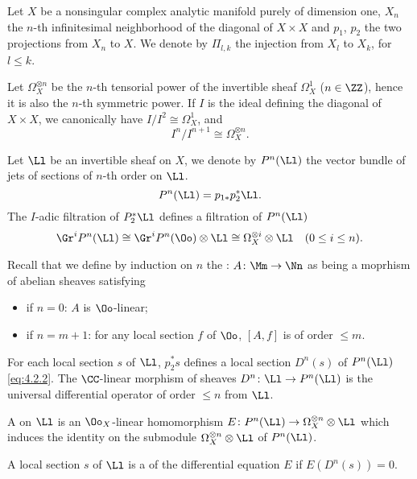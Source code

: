 \begin{para}\label{hypothesis:4.2}
  Let $X$ be a nonsingular complex analytic manifold purely of dimension one,
  $X_n$ the $n$-th infinitesimal neighborhood of the diagonal of $X\times X$
  and $p_1$, $p_2$ the two projections from $X_n$ to $X$.
  We denote by $\Pi_{l,k}$ the injection from $X_l$ to $X_k$, for $l\le k$.

  Let $\Omega_X^{\otimes n}$ be the $n$-th tensorial power of the invertible
  sheaf $\Omega_X^1$ ($n\in\ZZ$), hence it is also the $n$-th symmetric power.
  If $I$ is the ideal defining the diagonal of $X\times X$, we canonically have
  $I/I^2\cong\Omega_X^1$, and
  \begin{equation}
    I^n/I^{n+1} \cong \Omega_X^{\otimes n}.
  \end{equation}

  Let $\Ll$ be an invertible sheaf on $X$, we denote by $P^n(\Ll)$ the vector
  bundle of jets of sections of $n$-th order on $\Ll$.
  \begin{equation}\label{eq:4.2.2}
    P^n(\Ll) = p_{1\ast}p_2^\ast\Ll.
  \end{equation}
  The $I$-adic filtration of $P_2^{\ast}\Ll$ defines a filtration of $P^n(\Ll)$
  \begin{equation}\label{eq:4.2.3}
    \Gr^iP^n(\Ll) \cong \Gr^iP^n(\Oo)\otimes\Ll
    \cong \Omega_X^{\otimes i}\otimes\Ll\quad(0\le i\le n).
  \end{equation}

  Recall that we define by induction on $n$ the : $A\colon\Mm\to\Nn$
  as being a moprhism of abelian sheaves satisfying
  \begin{itemize}
    \item if $n=0$: $A$ is $\Oo$-linear;
    \item if $n=m+1$: for any local section $f$ of $\Oo$, $[A,f]$ is of order
    $\le m$.
  \end{itemize}

  For each local section $s$ of $\Ll$, $p_2^{\ast}s$ defines a local section
  $D^n(s)$ of $P^n(\Ll)$ \cref{eq:4.2.2}.
  The $\CC$-linear morphism of sheaves $D^n\colon\Ll\to P^n(\Ll)$ is the
  universal differential operator of order $\le n$ from $\Ll$.
\end{para}

\begin{definition}
  \begin{paras}
    \item A 
    on $\Ll$ is an $\Oo_X$-linear homomorphism
    $E\colon P^n(\Ll)\to\Omega_X^{\otimes n}\otimes\Ll$
    which induces the identity on the submodule
    $\Omega_X^{\otimes n}\otimes\Ll$ of $P^n(\Ll)$.
    \item A local section $s$  of $\Ll$ is a  of the
    differential equation $E$ if $E(D^n(s))=0$.
  \end{paras}
\end{definition}

